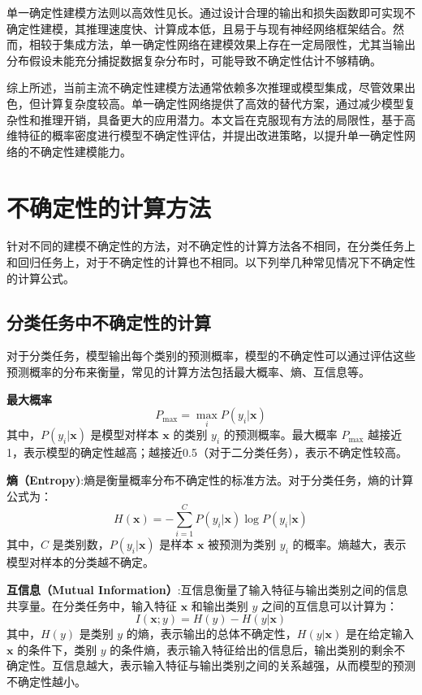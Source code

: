单一确定性建模方法则以高效性见长。通过设计合理的输出和损失函数即可实现不确定性建模，其推理速度快、计算成本低，且易于与现有神经网络框架结合。然而，相较于集成方法，单一确定性网络在建模效果上存在一定局限性，尤其当输出分布假设未能充分捕捉数据复杂分布时，可能导致不确定性估计不够精确。  

综上所述，当前主流不确定性建模方法通常依赖多次推理或模型集成，尽管效果出色，但计算复杂度较高。单一确定性网络提供了高效的替代方案，通过减少模型复杂性和推理开销，具备更大的应用潜力。本文旨在克服现有方法的局限性，基于高维特征的概率密度进行模型不确定性评估，并提出改进策略，以提升单一确定性网络的不确定性建模能力。

\section{不确定性的计算方法}
针对不同的建模不确定性的方法，对不确定性的计算方法各不相同，在分类任务上和回归任务上，对于不确定性的计算也不相同。以下列举几种常见情况下不确定性的计算公式。

\subsection{分类任务中不确定性的计算}

对于分类任务，模型输出每个类别的预测概率，模型的不确定性可以通过评估这些预测概率的分布来衡量，常见的计算方法包括最大概率\cite{hendrycks2017a}、熵\cite{wimmer2023quantifying}、互信息\cite{wimmer2023quantifying}等。

\textbf{最大概率}
    \[
    P_{\text{max}} = \max_{i} P(y_i | \mathbf{x})
    \]
    其中，\( P(y_i | \mathbf{x}) \) 是模型对样本 \( \mathbf{x} \) 的类别 \( y_i \) 的预测概率。最大概率 \( P_{\text{max}} \) 越接近1，表示模型的确定性越高；越接近0.5（对于二分类任务），表示不确定性较高。


\textbf{熵（Entropy)}:熵是衡量概率分布不确定性的标准方法。对于分类任务，熵的计算公式为：
\[
H(\mathbf{x}) = - \sum_{i=1}^{C} P(y_i | \mathbf{x}) \log P(y_i | \mathbf{x})
\]
其中，\( C \) 是类别数，\( P(y_i | \mathbf{x}) \) 是样本 \( \mathbf{x} \) 被预测为类别 \( y_i \) 的概率。熵越大，表示模型对样本的分类越不确定。


\textbf{互信息（Mutual Information）}:互信息衡量了输入特征与输出类别之间的信息共享量。在分类任务中，输入特征 \( \mathbf{x} \) 和输出类别 \( y \) 之间的互信息可以计算为：
\[
I(\mathbf{x}; y) = H(y) - H(y | \mathbf{x})
\]
其中，\( H(y) \) 是类别 \( y \) 的熵，表示输出的总体不确定性，\( H(y | \mathbf{x}) \) 是在给定输入 \( \mathbf{x} \) 的条件下，类别 \( y \) 的条件熵，表示输入特征给出的信息后，输出类别的剩余不确定性。互信息越大，表示输入特征与输出类别之间的关系越强，从而模型的预测不确定性越小。

